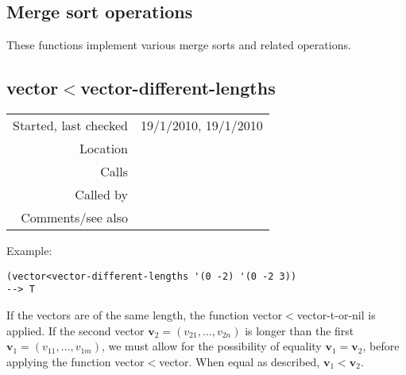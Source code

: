 \subsection{Merge sort operations}\label{sec:merge-sort-operations}

These functions implement various merge
sorts and related operations.


\subsection*{vector$<$vector-different-lengths}\label{fun:vector<vector-different-lengths}

\vspace{0.3cm}
\begin{tabular}{r|p{8cm}}
Started, last checked & 19/1/2010, 19/1/2010 \\
Location & \nameref{sec:list-processing} \\
Calls & \nameref{fun:vector<vector-t-or-nil} \\
Called by & \\
Comments/see also & 
\end{tabular}

\vspace{0.5cm}
\noindent Example:
\begin{verbatim}
(vector<vector-different-lengths '(0 -2) '(0 -2 3))
--> T
\end{verbatim}

\noindent If the vectors are of the same length,
the function vector$<$vector-t-or-nil is applied. If
the second vector $\mathbf{v}_2 = (v_{21},\ldots,
v_{2n})$ is longer than the first $\mathbf{v}_1 =
(v_{11},\ldots,v_{1m})$, we must allow for the
possibility of equality $\mathbf{v}_1 = \mathbf{v}_2$,
before applying the function vector$<$vector. When equal
as described, $\mathbf{v}_1 < \mathbf{v}_2$.













